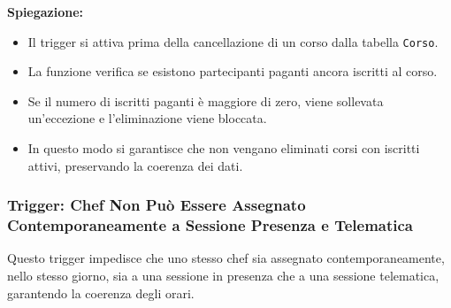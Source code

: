 \textbf{Spiegazione:}
\begin{itemize}
    \item Il trigger si attiva prima della cancellazione di un corso dalla tabella \texttt{Corso}.
    \item La funzione verifica se esistono partecipanti paganti ancora iscritti al corso.
    \item Se il numero di iscritti paganti è maggiore di zero, viene sollevata un'eccezione e l'eliminazione viene bloccata.
    \item In questo modo si garantisce che non vengano eliminati corsi con iscritti attivi, preservando la coerenza dei dati.
\end{itemize}

\subsubsection{Trigger: Chef Non Può Essere Assegnato Contemporaneamente a Sessione Presenza e Telematica}

Questo trigger impedisce che uno stesso chef sia assegnato contemporaneamente, nello stesso giorno, sia a una sessione in presenza che a una sessione telematica, garantendo la coerenza degli orari.

